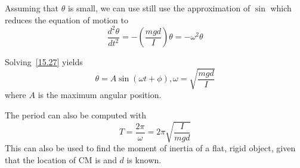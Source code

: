 Assuming that $\theta$ is small, we can use still use the approximation of $\sin$ which reduces the 
equation of motion to 
\begin{equation}\label{15.27}
    \frac{d^2\theta}{dt^2} = -\left(\frac{mgd}{I}\right)\theta = -\omega^2\theta
\end{equation}

Solving~\eqref{15.27} yields 
\begin{equation}
    \theta = A\sin(\omega t + \phi), \omega = \sqrt{\frac{mgd}{I}}
\end{equation}
where $A$ is the maximum angular position.

The period can also be computed with 
\begin{equation}\label{15.28}
    T = \frac{2\pi}{\omega} = 2\pi\sqrt{\frac{I}{mgd}}
\end{equation}
This can also be used to find the moment of inertia of a flat, rigid object, given that the location 
of CM is and $d$ is known.